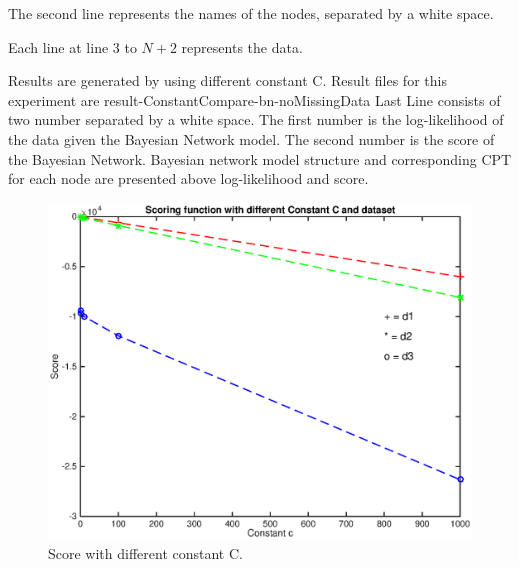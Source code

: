 \documentclass{article}
\begin{document}
The second line represents the names of the nodes, separated by a white space. 

Each line at line 3 to $N+2$ represents the data. 

Results are generated by using different constant C. Result files for this experiment are result-ConstantCompare-bn-noMissingData Last Line consists of two number separated by a white space. The first number is the log-likelihood of the data given the Bayesian Network model. The second number is the score of the Bayesian Network. Bayesian network model structure and corresponding CPT for each node are presented above log-likelihood and score.

\begin{figure}[ht]
\vskip 0.2in
\begin{center}
\centerline{\includegraphics[width=\columnwidth]{constant_comp}}
\caption{Score with different constant C.}
\label{constant_Comp}
\end{center}
\vskip -0.2in
\end{figure} 
\end{document}
